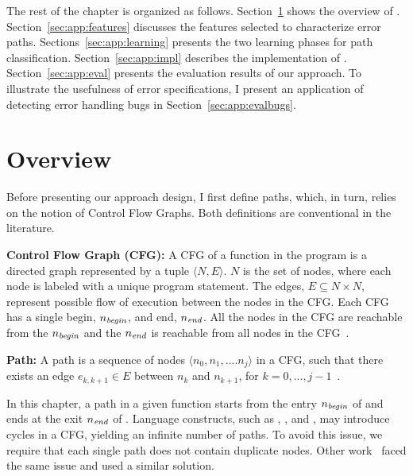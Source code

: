 \documentclass[12pt]{report}	%
\begin{document}
The rest of the chapter is organized as follows.
Section~\ref{sec:app:overview} shows the overview of \newTool.
Section~\ref{sec:app:features} discusses the features selected to characterize error paths.
Sections~\ref{sec:app:learning} presents the two learning phases for path classification.
%
%
Section~\ref{sec:app:impl} describes the implementation of \newTool.
Section~\ref{sec:app:eval} presents the evaluation results of our approach.
To illustrate the usefulness of error specifications, I present an
application of detecting error handling bugs in Section~\ref{sec:app:evalbugs}.


\section{Overview}
\label{sec:app:overview}

Before presenting our approach design, I first define paths, 
which, in turn, relies on the notion of Control Flow Graphs.
Both definitions are conventional in the literature.


\theoremstyle{definition}
\begin{definition}{\textbf{Control Flow Graph (CFG):}}
A CFG of a function in the program is a directed graph represented by a tuple $\langle N, E \rangle$. 
$N$ is the set of nodes, where each node is labeled with a unique program statement. 
The edges, $E \subseteq N \times N$, represent possible flow of execution between the nodes in the CFG. 
Each CFG has a single begin, $n_{\it{begin}}$, and end, $n_{\it{end}}$. 
All the nodes in the CFG are reachable from the $n_{\it{begin}}$ 
and the $n_{\it{end}}$ is reachable from all nodes in the CFG~\cite{Person:2011:DIS:1993498.1993558}.
\end{definition}

\begin{definition}{\textbf{Path:}}
A path is a sequence of nodes 
$\langle n_0, n_1, .... n_j \rangle$ in a CFG, 
such that there exists an edge $e_{k, k+1} \in E$ between $n_k$ and $n_{k+1}$, 
for $k = 0,...,j-1$~\cite{Nejmeh:1988:NME:42372.42379}.
\end{definition}

In this chapter, a path in a given function  starts from the entry $n_{\it{begin}}$ of 
and ends at the exit $n_{\it{end}}$ of .
Language constructs,
such as , , and ,
may introduce cycles in a CFG,
yielding an infinite number of paths.
To avoid this issue, we require that each single path does not contain duplicate nodes. 
%
Other work~\cite{Kang:2016:AAI:2970276.2970354,Tian:2017:ADR,jana2016automatically}
faced the same issue and used a similar solution. 
\end{document}
